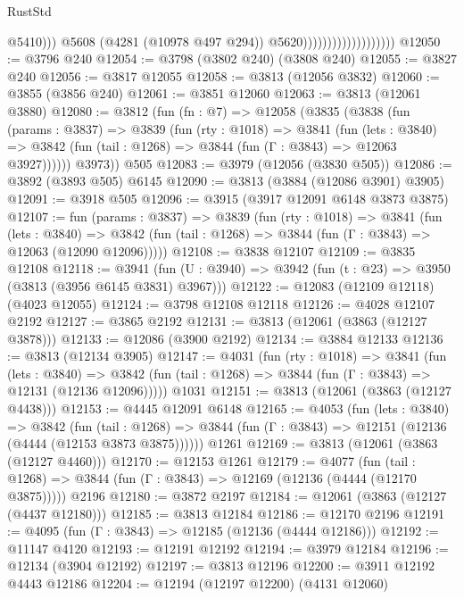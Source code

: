 \begin{lexlean}{RustStd}
\begin{coremodule}
{\begin{coremodule}
{{{{{{{{{{{{{{{{{{{{{{{{{{{{{{{{{{{                                                @5410)))
                                          @5608
                                          (@4281 (@10978 @497 @294))
                                          @5620)))))))))))))))))))
@12050 := @3796 @240
@12054 := @3798 (@3802 @240) (@3808 @240)
@12055 := @3827 @240
@12056 := @3817 @12055
@12058 := @3813 (@12056 @3832)
@12060 := @3855 (@3856 @240)
@12061 := @3851 @12060
@12063 := @3813 (@12061 @3880)
@12080 := @3812
    (fun (fn : @7) =>
    @12058
      (@3835
        (@3838
          (fun (params : @3837) =>
          @3839
            (fun (rty : @1018) =>
            @3841
              (fun (lets : @3840) =>
              @3842 (fun (tail : @1268) => @3844 (fun (Γ : @3843) => @12063 @3927))))))
        @3973))
    @505
@12083 := @3979 (@12056 (@3830 @505))
@12086 := @3892 (@3893 @505) @6145
@12090 := @3813 (@3884 (@12086 @3901) @3905)
@12091 := @3918 @505
@12096 := @3915 (@3917 @12091 @6148 @3873 @3875)
@12107 := fun (params : @3837) =>
  @3839
    (fun (rty : @1018) =>
    @3841
      (fun (lets : @3840) =>
      @3842 (fun (tail : @1268) => @3844 (fun (Γ : @3843) => @12063 (@12090 @12096)))))
@12108 := @3838 @12107
@12109 := @3835 @12108
@12118 := @3941
    (fun (U : @3940) => @3942 (fun (t : @23) => @3950 (@3813 (@3956 @6145 @3831) @3967)))
@12122 := @12083 (@12109 @12118) (@4023 @12055)
@12124 := @3798 @12108 @12118
@12126 := @4028 @12107 @2192
@12127 := @3865 @2192
@12131 := @3813 (@12061 (@3863 (@12127 @3878)))
@12133 := @12086 (@3900 @2192)
@12134 := @3884 @12133
@12136 := @3813 (@12134 @3905)
@12147 := @4031
    (fun (rty : @1018) =>
    @3841
      (fun (lets : @3840) =>
      @3842 (fun (tail : @1268) => @3844 (fun (Γ : @3843) => @12131 (@12136 @12096)))))
    @1031
@12151 := @3813 (@12061 (@3863 (@12127 @4438)))
@12153 := @4445 @12091 @6148
@12165 := @4053
    (fun (lets : @3840) =>
    @3842
      (fun (tail : @1268) =>
      @3844 (fun (Γ : @3843) => @12151 (@12136 (@4444 (@12153 @3873 @3875))))))
    @1261
@12169 := @3813 (@12061 (@3863 (@12127 @4460)))
@12170 := @12153 @1261
@12179 := @4077
    (fun (tail : @1268) => @3844 (fun (Γ : @3843) => @12169 (@12136 (@4444 (@12170 @3875)))))
    @2196
@12180 := @3872 @2197
@12184 := @12061 (@3863 (@12127 (@4437 @12180)))
@12185 := @3813 @12184
@12186 := @12170 @2196
@12191 := @4095 (fun (Γ : @3843) => @12185 (@12136 (@4444 @12186)))
@12192 := @11147 @4120
@12193 := @12191 @12192
@12194 := @3979 @12184
@12196 := @12134 (@3904 @12192)
@12197 := @3813 @12196
@12200 := @3911 @12192 @4443 @12186
@12204 := @12194 (@12197 @12200) (@4131 @12060)
}}}}}}}}}}}}}}}}}}}}}}}}}}}}}}}}}}}
\end{coremodule}}
\end{coremodule}
\end{lexlean}
